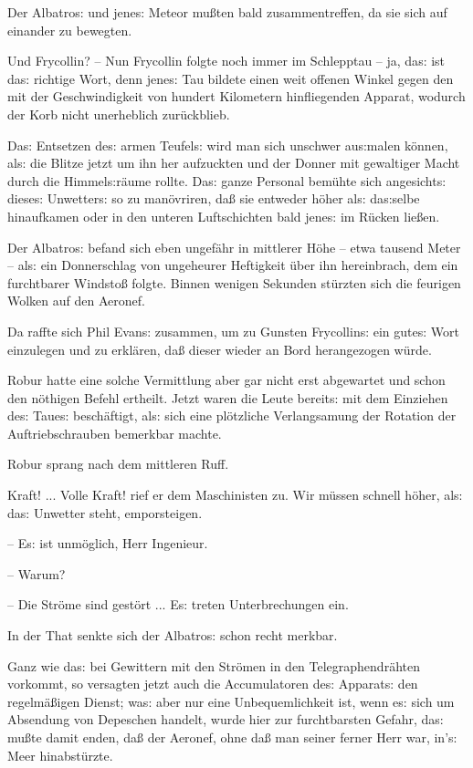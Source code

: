 \documentclass[oneside,12pt]{book}
\newcommand{\s}{s:}
\begin{document}
Der {\glqq}Albatro{\s}{\grqq} und jene{\s} Meteor mu{\ss}ten bald
zusammentreffen, da sie sich auf einander zu bewegten.

Und Frycollin? -- Nun Frycollin folgte noch immer im Schlepptau --
ja, da{\s} ist da{\s} richtige Wort, denn jene{\s} Tau bildete einen
weit offenen Winkel gegen den mit der Geschwindigkeit von hundert
Kilometern hinfliegenden Apparat, wodurch der Korb nicht unerheblich
zur\"uckblieb.

Da{\s} Entsetzen de{\s} armen Teufel{\s} wird man sich unschwer
au{\s}malen k\"onnen, al{\s} die Blitze jetzt um ihn her aufzuckten
und der Donner mit gewaltiger Macht durch die Himmel{\s}r\"aume
rollte. Da{\s} ganze Personal bem\"uhte sich angesicht{\s} diese{\s}
Unwetter{\s} so zu man\"ovriren, da{\ss} sie entweder h\"oher al{\s}
da{\s}selbe hinaufkamen oder in den unteren Luftschichten bald
jene{\s} im R\"ucken lie{\ss}en.

Der {\glqq}Albatro{\s}{\grqq} befand sich eben ungef\"ahr in
mittlerer H\"ohe -- etwa tausend Meter -- al{\s} ein Donnerschlag von
ungeheurer Heftigkeit \"uber ihn hereinbrach, dem ein furchtbarer
Windsto{\ss} folgte. Binnen wenigen Sekunden st\"urzten sich die
feurigen Wolken auf den Aeronef.

Da raffte sich Phil Evan{\s} zusammen, um zu Gunsten Frycollin{\s}
ein gute{\s} Wort einzulegen und zu erkl\"aren, da{\ss} dieser wieder
an Bord herangezogen w\"urde.

Robur hatte eine solche Vermittlung aber gar nicht erst abgewartet
und schon den n\"othigen Befehl ertheilt. Jetzt waren die Leute
bereit{\s} mit dem Einziehen de{\s} Taue{\s} besch\"aftigt, al{\s}
sich eine pl\"otzliche Verlangsamung der Rotation der
Auftriebschrauben bemerkbar machte.

Robur sprang nach dem mittleren Ruff.

{\glqq}Kraft! ... Volle Kraft! rief er dem Maschinisten zu. Wir
m\"ussen schnell h\"oher, al{\s} da{\s} Unwetter steht, emporsteigen.

-- E{\s} ist unm\"oglich, Herr Ingenieur.

-- Warum?

-- Die Str\"ome sind gest\"ort ... E{\s} treten Unterbrechungen
ein.{\grqq}

In der That senkte sich der {\glqq}Albatro{\s}{\grqq} schon recht
merkbar.

Ganz wie da{\s} bei Gewittern mit den Str\"omen in den
Telegraphendr\"ahten vorkommt, so versagten jetzt auch die
Accumulatoren de{\s} Apparat{\s} den regelm\"a{\ss}igen Dienst;
wa{\s} aber nur eine Unbequemlichkeit ist, wenn e{\s} sich um
Absendung von Depeschen handelt, wurde hier zur furchtbarsten Gefahr,
da{\s} mu{\ss}te damit enden, da{\ss} der Aeronef, ohne da{\ss} man
seiner ferner Herr war, in'{\s} Meer hinabst\"urzte.
\end{document}
